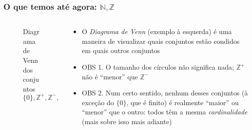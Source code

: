\documentclass[usenames,dvipsnames,svgnames]{beamer}
\begin{document}
\begin{frame}
	
	\frametitle{O que temos até agora: $\mathbb{N}, \mathbb{Z}$}

	\begin{columns}[t]
	\begin{column}{.4\textwidth}
		\begin{figure}
			\def\Zcircle{		(0,0) 			circle (2.5cm)}
			\def\Ncircle{		(1.25cm:-1.25cm) circle (1.1cm)}
			\def\Zminuscircle{	(1.25cm:1.25cm) circle (1.1cm)}
			\def\Zpluscircle{	(1cm:-1.75cm) circle (0.5cm)}
			\def\zerocircle{	(1.5cm:-0.75cm) circle (0.5cm)}

			\caption{Diagrama de Venn dos conjuntos $\{0\}, \mathbb{Z}^{+}, \mathbb{Z}^{-}, \mathbb{N}, \mathbb{Z}$}
		\end{figure}
	\end{column}
	\begin{column}{.6\textwidth}
		\begin{itemize}
		\item O \emph{Diagrama de Venn} (exemplo à esquerda) é uma maneira de visualizar quais conjuntos {\color{red} estão condidos em} quais outros conjuntos
		\item OBS 1. O tamanho dos círculos não significa nada; $\mathbb{Z}^{+}$ não é ``menor'' que $\mathbb{Z}^{-}$
		\item OBS 2. Num certo sentido, nenhum desses conjuntos (à exceção do $\{0\}$, que é finito) é realmente ``maior'' ou ``menor'' que o outro: todos têm a mesma \emph{cardinalidade} (mais sobre isso mais adiante)
		\end{itemize}
	\end{column}
	\end{columns}

\end{frame}
\end{document}
